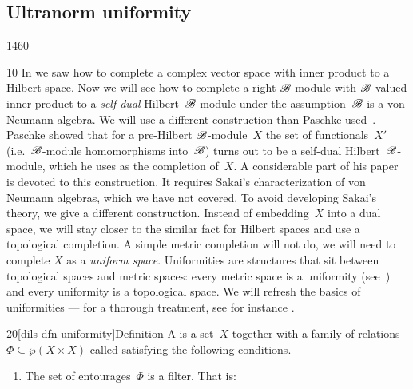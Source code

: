 \subsection{Ultranorm uniformity}
\begin{parsec}{1460}%
\begin{point}{10}%
In 
    we saw how to complete a complex vector space with inner product
    to a Hilbert space.
Now we will see how to complete a right $\mathscr{B}$-module
    with $\mathscr{B}$-valued inner product
    to a \emph{self-dual} Hilbert~$\mathscr{B}$-module
    under the assumption~$\mathscr{B}$ is a von Neumann algebra.
    We will use a different construction than Paschke used~\cite{paschke}.
Paschke showed that for a pre-Hilbert $\mathscr{B}$-module~$X$
    the set of functionals~$X'$
        (i.e.~$\mathscr{B}$-module homomorphisms into~$\mathscr{B}$)
    turns out to  be a self-dual Hilbert~$\mathscr{B}$-module,
    which he uses as the completion of~$X$.
A considerable part of his paper~\cite{paschke}
    is devoted to this construction.
It requires Sakai's characterization of von Neumann algebras,
    which we have not covered.
To avoid developing Sakai's theory,
    we give a different construction.
Instead of embedding~$X$ into a dual space,
    we will stay closer to the similar fact for Hilbert spaces
    and use a topological completion.
A simple metric completion will not do,
    we will need to complete $X$ as a \emph{uniform space}.
Uniformities are structures that sit between topological spaces
    and metric spaces: every metric space is a uniformity
        (see~)
        and every uniformity is a topological space.
We will refresh the basics of uniformities ---
for a thorough treatment, see for instance \cite[ch.~9]{willard}.
\end{point}
\begin{point}{20}[dils-dfn-uniformity]{Definition}%
    A  is a set~$X$
    together with a family of relations
    $\Phi \subseteq \wp (X\times X)$ called 
        satisfying the following conditions.
    \begin{enumerate}
    \item
        The set of entourages~$\Phi$ is a filter.
        That is:
\end{enumerate}
\end{point}
\end{parsec}
